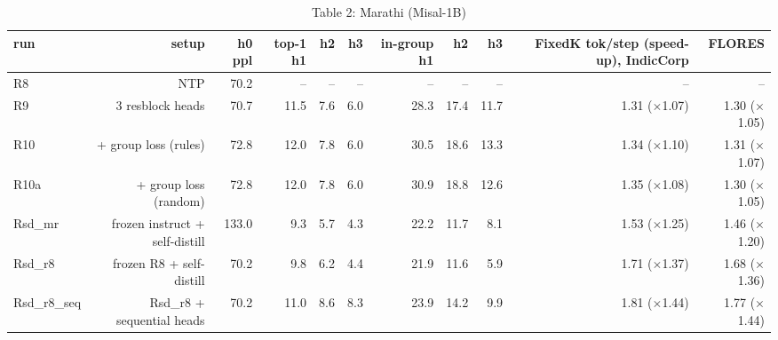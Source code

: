 \begin{table}[t]
\centering
\small
\caption{Table 2: Marathi (Misal-1B)}
\label{tab:table2_main_mr}
\begin{tabular}{lrrrrrrrrrr}
\toprule
run & setup & h0 ppl & top-1 h1 & h2 & h3 & in-group h1 & h2 & h3 & FixedK tok/step (speed-up), IndicCorp & FLORES \\
\midrule
R8 & NTP & 70.2 & -- & -- & -- & -- & -- & -- & -- & -- \\
R9 & 3 resblock heads & 70.7 & 11.5 & 7.6 & 6.0 & 28.3 & 17.4 & 11.7 & 1.31 ($\times$1.07) & 1.30 ($\times$1.05) \\
R10 & + group loss (rules) & 72.8 & 12.0 & 7.8 & 6.0 & 30.5 & 18.6 & 13.3 & 1.34 ($\times$1.10) & 1.31 ($\times$1.07) \\
R10a & + group loss (random) & 72.8 & 12.0 & 7.8 & 6.0 & 30.9 & 18.8 & 12.6 & 1.35 ($\times$1.08) & 1.30 ($\times$1.05) \\
Rsd\_mr & frozen instruct + self-distill & 133.0 & 9.3 & 5.7 & 4.3 & 22.2 & 11.7 & 8.1 & 1.53 ($\times$1.25) & 1.46 ($\times$1.20) \\
Rsd\_r8 & frozen R8 + self-distill & 70.2 & 9.8 & 6.2 & 4.4 & 21.9 & 11.6 & 5.9 & 1.71 ($\times$1.37) & 1.68 ($\times$1.36) \\
Rsd\_r8\_seq & Rsd\_r8 + sequential heads & 70.2 & 11.0 & 8.6 & 8.3 & 23.9 & 14.2 & 9.9 & 1.81 ($\times$1.44) & 1.77 ($\times$1.44) \\
\bottomrule
\end{tabular}
\end{table}

